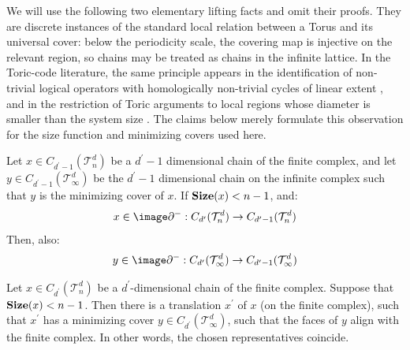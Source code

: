 We will use the following two elementary lifting facts and omit their proofs. They are discrete instances of the standard local relation between a Torus and its universal cover: below the periodicity scale, the covering map is injective on the relevant region, so chains may be treated as chains in the infinite lattice. In the Toric-code literature, the same principle appears in the identification of non-trivial logical operators with homologically non-trivial cycles of linear extent \cite{Dennis_2002}, and in the restriction of Toric arguments to local regions whose diameter is smaller than the system size \cite{Kubica_2019}. The claims below merely formulate this observation for the size function and minimizing covers used here.

\begin{claim}
  \label{claim:liftb}
  Let $x \in C_{d^{\prime}-1}(\mathcal{T}_n^d)$ be a $d^{\prime}-1$ dimensional chain of the finite complex, and let $y \in C_{d^{\prime}-1}(\mathcal T_\infty^d)$ be the $d^{\prime}-1$ dimensional chain on the infinite complex such that $y$ is the minimizing cover of $x$. If $\mathbf{Size}(x) < n-1$, and:
\begin{equation*}
  \begin{split}
    x \in \image \partial^{-} : C_{d^{\prime}}(\mathcal{T}_n^d) \rightarrow C_{d^{\prime}-1}(\mathcal{T}_n^d)
  \end{split}
\end{equation*}
Then, also:
\begin{equation*}
  \begin{split}
    y \in \image \partial^{-} : C_{d^{\prime}}(\mathcal T_\infty^d) \rightarrow C_{d^{\prime}-1}(\mathcal T_\infty^d)
  \end{split}
\end{equation*}
\end{claim}

\begin{claim}
  \label{claim:liftc}
Let $x \in C_{d^{\prime}}(\mathcal{T}_n^d)$ be a $d^{\prime}$-dimensional chain of the finite complex. Suppose that $\mathbf{Size}(x) < n-1$. Then there is a translation $x^{\prime}$ of $x$ (on the finite complex), such that $x^{\prime}$ has a minimizing cover $y \in C_{d^{\prime}}(\mathcal T_\infty^d)$, such that the faces of $y$ align with the finite complex. In other words, the chosen representatives coincide.
\end{claim}


